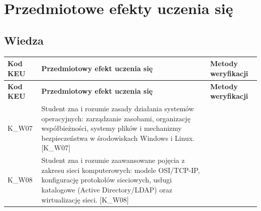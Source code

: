 \documentclass[12pt, a4paper]{article}
\newcommand{\thdrule}{\noalign{\global\setlength{\extrarowheight}{0pt}}}
\newcommand{\thdend}{\noalign{\global\setlength{\extrarowheight}{3pt}}}
\begin{document}
\section{Przedmiotowe efekty uczenia się}

\subsection*{Wiedza}
{\scriptsize
\begin{longtable}{m{1.6cm}m{9.0cm}m{4.2cm}}
\thdrule\toprule
\rowcolor{pjatkRed} {\color{white}\footnotesize\textbf{\vphantom{Ag}Kod KEU}} & {\color{white}\footnotesize\textbf{\vphantom{Ag}Przedmiotowy efekt uczenia się}} & {\color{white}\footnotesize\textbf{\vphantom{Ag}Metody weryfikacji}} \\
\midrule\thdend
\endfirsthead
\thdrule\toprule
\rowcolor{pjatkRed} {\color{white}\footnotesize\textbf{\vphantom{Ag}Kod KEU}} & {\color{white}\footnotesize\textbf{\vphantom{Ag}Przedmiotowy efekt uczenia się}} & {\color{white}\footnotesize\textbf{\vphantom{Ag}Metody weryfikacji}} \\
\midrule\thdend
\endhead
  \rowcolor{tableRowLight} K\_W07 & Student zna i rozumie zasady działania systemów operacyjnych: zarządzanie zasobami, organizację współbieżności, systemy plików i mechanizmy bezpieczeństwa w środowiskach Windows i Linux. {[}K\_W07{]} &  \\
  \rowcolor{tableRowAlt} K\_W08 & Student zna i rozumie zaawansowane pojęcia z zakresu sieci komputerowych: modele OSI/TCP-IP, konfigurację protokołów sieciowych, usługi katalogowe (Active Directory/LDAP) oraz wirtualizację sieci. {[}K\_W08{]} &  \\
\bottomrule
\end{longtable}}
\end{document}
